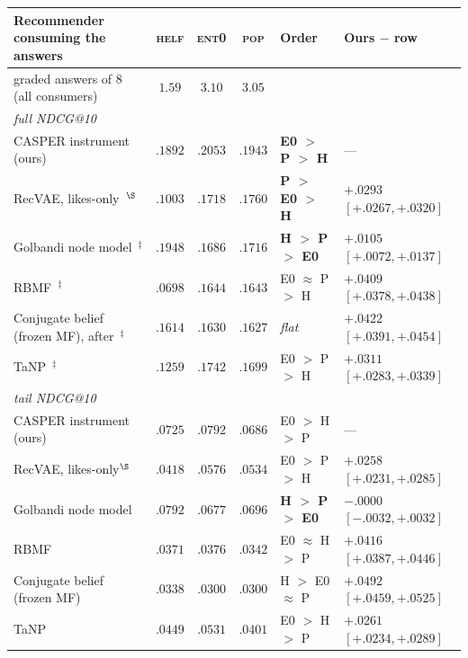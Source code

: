 \documentclass[manuscript,screen]{acmart}
\begin{document}
\begin{table}[t]\centering\scriptsize
\setlength{\tabcolsep}{4pt}
\renewcommand{\arraystretch}{1.18}
\begin{tabular}{p{3.6cm}ccc l l}
\toprule
Recommender consuming the answers & \textsc{helf} & \textsc{ent0} & \textsc{pop} &
  Order & Ours $-$ row \\
\midrule
graded answers of 8 (all consumers) & $1.59$ & $3.10$ & $3.05$ & & \\
\midrule
\multicolumn{6}{l}{\emph{full NDCG@10}}\\
CASPER instrument (ours) & $.1892$ & $\mathbf{.2053}$ & $.1943$ & \textbf{E0 $>$ P $>$ H} & --- \\
RecVAE, likes-only~\citep{ren2020recvae}$^{\S}$ & $.1003$ & $.1718$ & $\mathbf{.1760}$ & \textbf{P $>$ E0 $>$ H} & $+.0293$ $[+.0267,+.0320]$ \\
Golbandi node model~\citep{golbandi2011adaptive}$^{\ddagger}$ & $\mathbf{.1948}$ & $.1686$ & $.1716$ & \textbf{H $>$ P $>$ E0} & $+.0105$ $[+.0072,+.0137]$ \\
RBMF~\citep{liu2011wisdom,zhou2011functional}$^{\ddagger}$ & $.0698$ & $.1644$ & $.1643$ & E0 $\approx$ P $>$ H & $+.0409$ $[+.0378,+.0438]$ \\
Conjugate belief (frozen MF), after~\citet{biyik2023soft}$^{\ddagger}$ & $.1614$ & $.1630$ & $.1627$ & \emph{flat} & $+.0422$ $[+.0391,+.0454]$ \\
TaNP~\citep{lin2021tanp}$^{\ddagger}$ & $.1259$ & $\mathbf{.1742}$ & $.1699$ & E0 $>$ P $>$ H & $+.0311$ $[+.0283,+.0339]$ \\
\midrule
\multicolumn{6}{l}{\emph{tail NDCG@10}}\\
CASPER instrument (ours) & $.0725$ & $\mathbf{.0792}$ & $.0686$ & E0 $>$ H $>$ P & --- \\
RecVAE, likes-only$^{\S}$ & $.0418$ & $\mathbf{.0576}$ & $.0534$ & E0 $>$ P $>$ H & $+.0258$ $[+.0231,+.0285]$ \\
Golbandi node model & $\mathbf{.0792}$ & $.0677$ & $.0696$ & \textbf{H $>$ P $>$ E0} & $-.0000$ $[-.0032,+.0032]$ \\
RBMF & $.0371$ & $\mathbf{.0376}$ & $.0342$ & E0 $\approx$ H $>$ P & $+.0416$ $[+.0387,+.0446]$ \\
Conjugate belief (frozen MF) & $\mathbf{.0338}$ & $.0300$ & $.0300$ & H $>$ E0 $\approx$ P & $+.0492$ $[+.0459,+.0525]$ \\
TaNP & $.0449$ & $\mathbf{.0531}$ & $.0401$ & E0 $>$ H $>$ P & $+.0261$ $[+.0234,+.0289]$ \\

\end{tabular}
\end{table}
\end{document}
